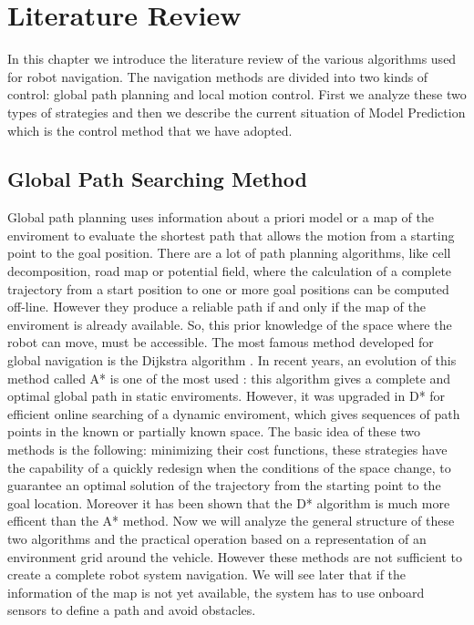 \chapter{Literature Review}
In this chapter we introduce the literature review of the various algorithms used for robot navigation. The navigation methods are divided into two kinds of control: global path planning and local motion control. First we analyze these two types of strategies and then we describe the current situation of Model Prediction which is the control method that we have adopted.
\section{Global Path Searching Method}
Global path planning uses information about a priori model or a map of the enviroment to evaluate the shortest path that allows the motion from a starting point to the goal position.
There are a lot of path planning algorithms, like cell decomposition, road map or potential field, where the calculation of a complete trajectory from a start position to one or more goal positions can be computed off-line. However they produce a reliable path if and only if the map of the enviroment is already available. So, this prior knowledge of the space where the robot can move, must be accessible.
The most famous method developed for global navigation is the Dijkstra algorithm \cite{Dijkstra:1959}. In recent years, an evolution of this method called A* is one of the most used \cite{Hart:1968}: this algorithm gives a complete and optimal global path in static enviroments. However, it was upgraded in D* \cite{Stentz93optimaland} for efficient online searching of a dynamic enviroment, which gives sequences of path points in the known or partially known space. The basic idea of these two methods is the following: minimizing their cost functions, these strategies have the capability of a quickly  redesign when the conditions of the space change, to guarantee an optimal solution of the trajectory from the starting point to the goal location. Moreover it has been shown that the D* algorithm is much more efficent than the A* method. Now we will analyze the general structure of these two algorithms and the practical operation based on a representation of an environment grid around the vehicle. However these methods are not sufficient to create a complete robot system navigation. We will see later that if the information of the map is not yet available, the system has to use onboard sensors to define a path and avoid obstacles.

